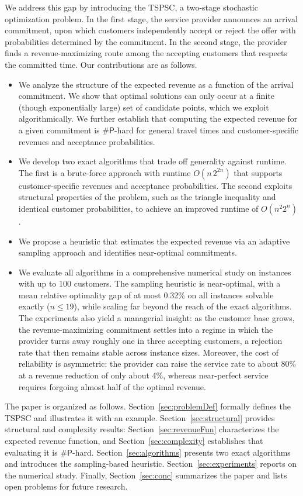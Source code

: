 \documentclass[11pt]{article}
\theoremstyle{plain}
\theoremstyle{definition}
\begin{document}
	We address this gap by introducing the \ac{TSPSC}, a two-stage stochastic optimization problem. In the first stage, the service provider announces an arrival commitment, upon which customers independently accept or reject the offer with probabilities determined by the commitment. In the second stage, the provider finds a revenue-maximizing route among the accepting customers that respects the committed time. Our contributions are as follows.
	
	\begin{itemize}
		\item We analyze the structure of the expected revenue as a function of the arrival commitment. We show that optimal solutions can only occur at a finite (though exponentially large) set of candidate points, which we exploit algorithmically. We further establish that computing the expected revenue for a given commitment is $\textsf{\#P}$-hard for general travel times and customer-specific revenues and acceptance probabilities.
		\item We develop two exact algorithms that trade off generality against runtime. The first is a brute-force approach with runtime $O(n\,2^{2n})$ that supports customer-specific revenues and acceptance probabilities. The second exploits structural properties of the problem, such as the triangle inequality and identical customer probabilities, to achieve an improved runtime of $O(n^2 2^n)$.
		\item We propose a heuristic that estimates the expected revenue via an adaptive sampling approach and identifies near-optimal commitments.
		\item We evaluate all algorithms in a comprehensive numerical study on instances with up to 100 customers. The sampling heuristic is near-optimal, with a mean relative optimality gap of at most 0.32\% on all instances solvable exactly ($n \leq 19$), while scaling far beyond the reach of the exact algorithms. The experiments also yield a managerial insight: as the customer base grows, the revenue-maximizing commitment settles into a regime in which the provider turns away roughly one in three accepting customers, a rejection rate that then remains stable across instance sizes. Moreover, the cost of reliability is asymmetric: the provider can raise the service rate to about 80\% at a revenue reduction of only about 4\%, whereas near-perfect service requires forgoing almost half of the optimal revenue.
	\end{itemize}
	
	
	\medskip
	The paper is organized as follows. Section~\ref{sec:problemDef} formally defines the \ac{TSPSC} and illustrates it with an example. Section~\ref{sec:structural} provides structural and complexity results: Section~\ref{sec:revenueFun} characterizes the expected revenue function, and Section~\ref{sec:complexity} establishes that evaluating it is $\textsf{\#P}$-hard. Section~\ref{sec:algorithms} presents two exact algorithms and  introduces the sampling-based heuristic. Section~\ref{sec:experiments} reports on the numerical study. Finally, Section~\ref{sec:conc} summarizes the paper and lists open problems for future research.
	
\end{document}
